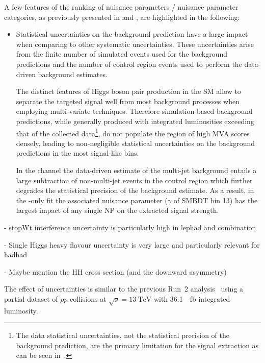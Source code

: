 A few features of the ranking of nuisance parameters / nuisance
parameter categories, as previously presented in
 and , are
highlighted in the following:
\begin{itemize}
\item Statistical uncertainties on the background prediction have a
  large impact when comparing to other systematic uncertainties. These
  uncertainties arise from the finite number of simulated events used
  for the background predictions and the number of control region
  events used to perform the data-driven \faketauhadvis background
  estimates.

  The distinct features of Higgs boson pair production in the SM allow
  to separate the targeted signal well from most background processes
  when employing multi-variate techniques. Therefore simulation-based
  background predictions, while generally produced with integrated
  luminosities exceeding that of the collected data\footnote{The data
    statistical uncertainties, not the statistical precision of the
    background prediction, are the primary limitation for the signal
    extraction as can be seen in~.}, do not
  populate the region of high MVA scores densely, leading to
  non-negligible statistical uncertainties on the background
  predictions in the most signal-like bins.

  In the \hadhad channel the data-driven estimate of the multi-jet
  background entails a large subtraction of non-multi-jet events in
  the control region which further degrades the statistical precision
  of the background estimate. As a result, in the \hadhad-only fit the
  associated nuisance parameter ($\gamma$ of SMBDT bin 13) has the
  largest impact of any single NP on the extracted signal strength.
\end{itemize}

- stopWt interference uncertainty is particularly high in lephad and combination

- Single Higgs heavy flavour uncertainty is very large and
particularly relevant for hadhad

- Maybe mention the HH cross section (and the downward asymmetry)


The effect of uncertainties is similar to the previous Run~2
analysis~\cite{HIGG-2016-16-witherratum} using a partial dataset of
$pp$ collisions at $\sqrt{s} = \SI{13}{\TeV}$ with
\SI{36.1}{\per\femto\barn} integrated luminosity.







